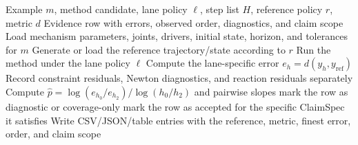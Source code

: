 \documentclass[10pt]{article}
\begin{document}
\begin{algorithm}[H]
\caption{Constructing one numerical evidence row}
\label{alg:evidence_row}
\begin{algorithmic}[1]
\Require Example $m$, method candidate, lane policy $\ell$, step list $H$, reference policy $r$, metric $d$
\Ensure Evidence row with errors, observed order, diagnostics, and claim scope
\State Load mechanism parameters, joints, drivers, initial state, horizon, and tolerances for $m$
\State Generate or load the reference trajectory/state according to $r$
  \State Run the method under the lane policy $\ell$
  \State Compute the lane-specific error $e_h=d(y_h,y_{\mathrm{ref}})$
  \State Record constraint residuals, Newton diagnostics, and reaction residuals separately
\EndFor
\State Compute $\widehat p=\log(e_{h_0}/e_{h_2})/\log(h_0/h_2)$ and pairwise slopes
  \State mark the row as diagnostic or coverage-only
\Else
  \State mark the row as accepted for the specific ClaimSpec it satisfies
\EndIf
\State Write CSV/JSON/table entries with the reference, metric, finest error, order, and claim scope
\end{algorithmic}
\end{algorithm}
\end{document}
